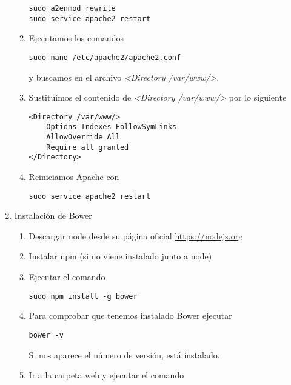 \begin{enumerate}
\begin{enumerate}
\begin{verbatim}
sudo a2enmod rewrite
sudo service apache2 restart
\end{verbatim}


\item Ejecutamos los comandos

\begin{verbatim}
sudo nano /etc/apache2/apache2.conf
\end{verbatim}

y buscamos en el archivo \emph{<Directory /var/www/>}.

\item Sustituimos el contenido de \emph{<Directory /var/www/>} por lo siguiente

\begin{verbatim}
<Directory /var/www/>
	Options Indexes FollowSymLinks
	AllowOverride All
	Require all granted
</Directory>
\end{verbatim}

\item Reiniciamos Apache con

\begin{verbatim}
sudo service apache2 restart
\end{verbatim}

\end{enumerate}

\item Instalación de Bower

\begin{enumerate}
\item Descargar node desde su página oficial \url{https://nodejs.org}
\item Instalar npm (si no viene instalado junto a node)
\item Ejecutar el comando 

\begin{verbatim}
sudo npm install -g bower
\end{verbatim}

\item Para comprobar que tenemos instalado Bower ejecutar 

\begin{verbatim}
bower -v
\end{verbatim} 

Si nos aparece el número de versión, está instalado.

\item Ir a la carpeta web y ejecutar el comando 


\end{enumerate}
\end{enumerate}
